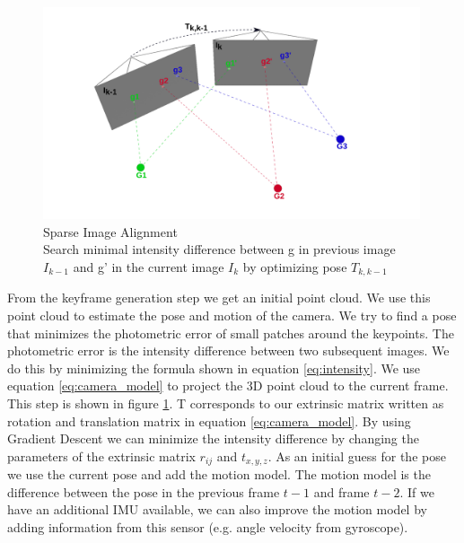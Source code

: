 \documentclass[11pt,a4paper,titlepage,oneside]{report}
\begin{document}
\begin{figure}[H]
  \centering
  \includegraphics[width=0.99\textwidth]{img/pose_estimation_sparse.png}
  \caption{Sparse Image Alignment\\
  Search minimal intensity difference between g in previous image $I_{k-1}$ and g' in the current image $I_k$ by optimizing pose $T_{k,k-1}$}
  \label{fig:sparse_image_alignment}
\end{figure}


From the keyframe generation step we get an initial point cloud. We use this point cloud to estimate the pose and motion of the camera. We try to find a pose that minimizes the photometric error of small patches around the keypoints. The photometric error is the intensity difference between two subsequent images. We do this by minimizing the formula shown in equation \ref{eq:intensity}. We use equation \ref{eq:camera_model} to project the 3D point cloud to the current frame. This step is shown in figure \ref{fig:sparse_image_alignment}. T corresponds to our extrinsic matrix written as rotation and translation matrix in equation \ref{eq:camera_model}. By using Gradient Descent we can minimize the intensity difference by changing the parameters of the extrinsic matrix $r_{ij}$ and $t_{x,y,z}$. As an initial guess for the pose we use the current pose and add the motion model. The motion model is the difference between the pose in the previous frame $t-1$ and frame $t-2$. If we have an additional IMU available, we can also improve the motion model by adding information from this sensor (e.g. angle velocity from gyroscope).
\end{document}
